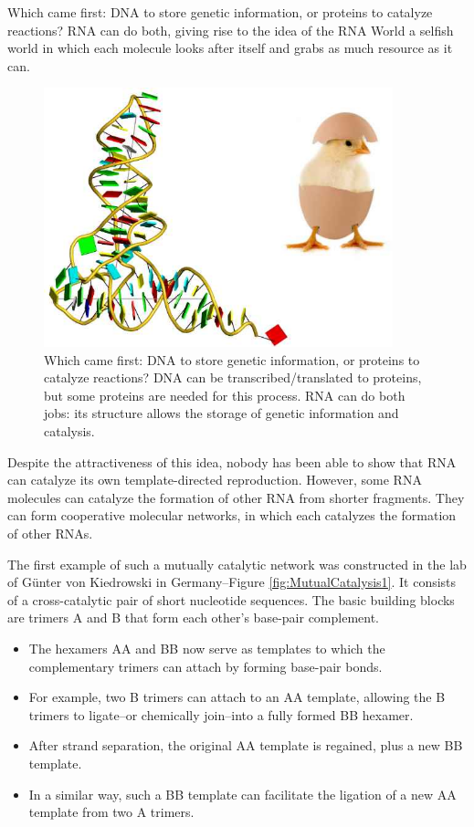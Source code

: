 \documentclass[]{article}
\begin{document}
Which came first: DNA to store genetic information, or proteins to catalyze reactions? RNA can do both, giving rise to the idea of the RNA World a selfish world in which each molecule looks after itself and grabs as much resource as it can.

\begin{figure}[H]
	\caption[Which came first: DNA or proteins?]{Which came first: DNA to store genetic information, or proteins to catalyze reactions?\cite{x3dna.org} DNA can be transcribed/translated to proteins, but some proteins are needed for this process. RNA can do both jobs: its structure allows the storage of genetic information and catalysis.}\label{TheRNAworld} 
	\includegraphics[width=0.9\textwidth]{TheRNAworld}
\end{figure}

Despite the attractiveness of this idea, nobody has been able to show that RNA can catalyze its own template-directed reproduction. However, some RNA molecules can catalyze the formation of other RNA from shorter fragments. They can form cooperative molecular networks, in which each catalyzes the formation of other RNAs.

The first example of such a mutually catalytic network
was constructed in the lab of Günter von Kiedrowski in Germany--Figure \ref{fig:MutualCatalysis1}. 
It consists of a cross-catalytic pair
of short nucleotide sequences.
The basic building blocks are
trimers A and B
that form each other's base-pair
complement.
\begin{itemize}
	\item The hexamers AA and BB now serve as templates
to which the complementary trimers can attach by forming base-pair bonds.
	\item For example, two B trimers can attach to an AA template, allowing the B trimers to ligate--or chemically join--into a fully formed BB hexamer.
	\item After strand separation, the original AA template is regained, plus a new BB template.
	\item In a similar way, such a BB template can facilitate the ligation of a new AA template from two A trimers.
\end{itemize}
\end{document}
